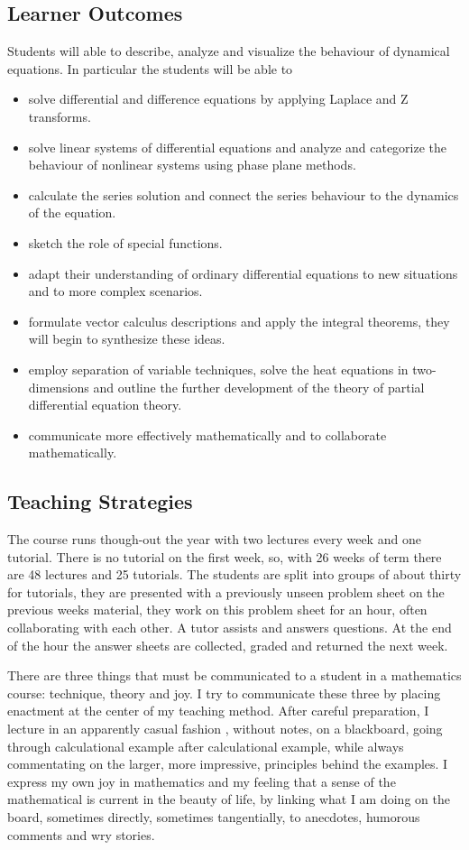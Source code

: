 \documentclass[12pt,a4wide]{article}
\begin{document}
\subsection*{Learner Outcomes}
Students will able to describe, analyze and visualize the behaviour of dynamical equations. In particular the students will be able to 
\begin{itemize}
\item solve differential and difference equations by applying Laplace and Z transforms.
\item solve linear systems of differential equations and analyze and categorize the behaviour of nonlinear systems using phase plane methods. 
\item calculate the series solution and connect the series behaviour to the dynamics of the equation. 
\item sketch the role of special functions.
\item adapt their understanding of ordinary differential equations to new situations and to more complex scenarios.
\item formulate vector calculus descriptions and apply the integral theorems, they will begin to synthesize these ideas.
\item employ separation of variable techniques, solve the heat equations in two-dimensions and outline the further development of the theory of partial differential equation theory.
\item communicate more effectively mathematically and to collaborate mathematically.
\end{itemize}


\subsection*{Teaching Strategies} 

The course runs though-out the year with two lectures every week and
one tutorial. There is no tutorial on the first week, so, with 26
weeks of term there are 48 lectures and 25 tutorials. The students are
split into groups of about thirty for tutorials, they are presented
with a previously unseen problem sheet on the previous weeks material,
they work on this problem sheet for an hour, often collaborating with
each other. A tutor assists and answers questions. At the end of the
hour the answer sheets are collected, graded and returned the next
week.

There are three things that must be communicated to a student in a
mathematics course: technique, theory and joy.  I try to communicate
these three by placing enactment at the center of my teaching
method. After careful preparation, I lecture in an apparently casual
fashion , without notes, on a blackboard, going through calculational
example after calculational example, while always commentating on the
larger, more impressive, principles behind the examples. I express my
own joy in mathematics and my feeling that a sense of the mathematical
is current in the beauty of life, by linking what I am doing on the
board, sometimes directly, sometimes tangentially, to anecdotes,
humorous comments and wry stories.
\end{document}

